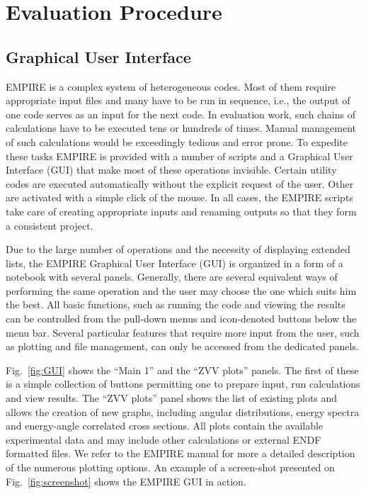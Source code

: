 
\section{Evaluation Procedure}

\subsection{Graphical User Interface}

EMPIRE is a complex system of heterogeneous codes. Most of them require
appropriate input files and many have to be run in sequence, i.e., the
output of one code serves as an input for the next code. In evaluation
work, such chains of calculations have to be executed tens or hundreds of
times. Manual management of such calculations would be exceedingly tedious
and error prone. To expedite these tasks EMPIRE is provided with a number of
scripts and a Graphical User Interface (GUI) that make most of these operations
invisible. Certain utility codes are executed automatically without the
explicit request of the user. Other are activated with a simple click of the
mouse. In all cases, the EMPIRE scripts take care of creating
appropriate inputs and renaming outputs so that they form a consistent project.

Due to the large number of operations and the necessity of displaying extended
lists, the EMPIRE Graphical User Interface (GUI) is organized in a form of a
notebook with several panels. Generally, there are several equivalent ways
of performing the same operation and the user may choose the one which suits
him the best. All basic functions, such as running the code and viewing the
results can be controlled from the pull-down menus and icon-denoted buttons
below the menu bar. Several particular features that require more input from
the user, such as plotting and file management, can only be accessed from
the dedicated panels.

Fig.~\ref{fig:GUI} shows the ``Main 1'' and the ``ZVV plots'' panels. The
first of these is a simple collection of buttons permitting
one to prepare input, run calculations and view results.
The ``ZVV plots'' panel shows the
list of existing plots and allows the creation of new graphs, including angular
distributions, energy spectra and energy-angle correlated cross sections.
All plots contain the available experimental data and may include other
calculations or external ENDF formatted files. We refer to the EMPIRE manual
for more a detailed description of the numerous plotting options. An example of
a screen-shot presented on Fig.~\ref{fig:screenshot} shows the EMPIRE GUI in
action.

